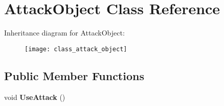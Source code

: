 \hypertarget{class_attack_object}{\section{Attack\-Object Class Reference}
\label{class_attack_object}
}
Inheritance diagram for Attack\-Object\-:\begin{figure}[H]
\begin{center}
\leavevmode
\texttt{[image: class\_attack\_object]}
\end{center}
\end{figure}
\subsection*{Public Member Functions}
\begin{DoxyCompactItemize}
\item 
\hypertarget{class_attack_object_a9d57cfc2f1cd8f3fac336e6eaa61de7b}{void {\bfseries Use\-Attack} ()}\label{class_attack_object_a9d57cfc2f1cd8f3fac336e6eaa61de7b}

\end{DoxyCompactItemize}
